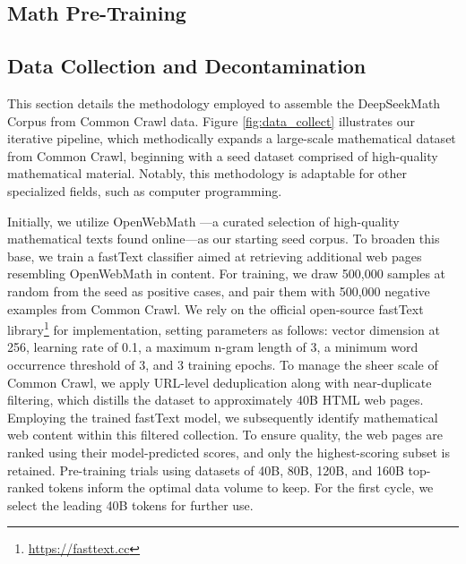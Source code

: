 \begin{itemize}[topsep=0pt]
\section{Math Pre-Training}

\subsection{Data Collection and Decontamination}
This section details the methodology employed to assemble the DeepSeekMath Corpus from Common Crawl data. Figure \ref{fig:data_collect} illustrates our iterative pipeline, which methodically expands a large-scale mathematical dataset from Common Crawl, beginning with a seed dataset comprised of high-quality mathematical material. Notably, this methodology is adaptable for other specialized fields, such as computer programming.

Initially, we utilize OpenWebMath \citep{openwebmath}—a curated selection of high-quality mathematical texts found online—as our starting seed corpus. To broaden this base, we train a fastText classifier \citep{joulin2016fasttext} aimed at retrieving additional web pages resembling OpenWebMath in content. For training, we draw 500,000 samples at random from the seed as positive cases, and pair them with 500,000 negative examples from Common Crawl. We rely on the official open-source fastText library\footnote{\url{https://fasttext.cc}} for implementation, setting parameters as follows: vector dimension at 256, learning rate of 0.1, a maximum n-gram length of 3, a minimum word occurrence threshold of 3, and 3 training epochs. To manage the sheer scale of Common Crawl, we apply URL-level deduplication along with near-duplicate filtering, which distills the dataset to approximately 40B HTML web pages. Employing the trained fastText model, we subsequently identify mathematical web content within this filtered collection. To ensure quality, the web pages are ranked using their model-predicted scores, and only the highest-scoring subset is retained. Pre-training trials using datasets of 40B, 80B, 120B, and 160B top-ranked tokens inform the optimal data volume to keep. For the first cycle, we select the leading 40B tokens for further use.


\end{itemize}
